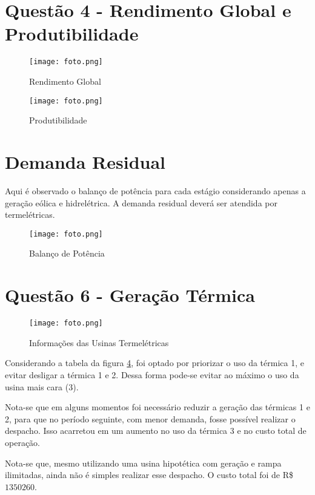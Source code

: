 \documentclass[a4paper,12pt,twoside]{article}
\begin{document}
\newpage
\section{Questão 4 - Rendimento Global e Produtibilidade}

\begin{figure}[h!]
    \centering
  \texttt{[image: foto.png]}
  \caption{Rendimento Global}\label{q4a}
\end{figure}

\begin{figure}[h!]
    \centering
  \texttt{[image: foto.png]}
  \caption{Produtibilidade}\label{q4b}
\end{figure}

\newpage
\section{Demanda Residual}
Aqui é observado o balanço de potência para cada estágio considerando apenas a geração eólica e hidrelétrica.
A demanda residual deverá ser atendida por termelétricas.

\begin{figure}[h!]
    \centering
  \texttt{[image: foto.png]}
  \caption{Balanço de Potência}\label{q5}
\end{figure}

\newpage
\section{Questão 6 - Geração Térmica}

\begin{figure}[h!]
    \centering
  \texttt{[image: foto.png]}
  \caption{Informações das Usinas Termelétricas}\label{termicas}
\end{figure}

Considerando a tabela da figura \ref{termicas},
foi optado por priorizar o uso da térmica 1,
e evitar desligar a térmica 1 e 2.
Dessa forma pode-se evitar ao máximo o uso da usina mais cara (3).

Nota-se que em alguns momentos foi necessário reduzir a geração das térmicas 1 e 2,
para que no período seguinte, com menor demanda, fosse possível realizar o despacho.
Isso acarretou em um aumento no uso da térmica 3 e no custo total de operação.

Nota-se que, mesmo utilizando uma usina hipotética com geração e rampa ilimitadas,
ainda não é simples realizar esse despacho.
O custo total foi de R\$ \(1350260\).
\end{document}
